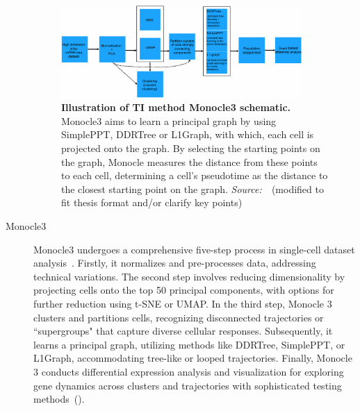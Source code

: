 \begin{description}
\begin{figure}[h!]
  	\centering
  	\includegraphics[width=0.90\textwidth]{TI_Alg_Monocle3/fig}
  	\vspace{0.1cm}
  	\caption[Illustration of TI method Monocle3 schematic.]{\textbf{Illustration of TI method Monocle3 schematic.} Monocle3 aims to learn a principal graph by using SimplePPT, DDRTree or L1Graph, with which, each cell is projected onto the graph. By selecting the starting points on the graph, Monocle measures the distance from these points to each cell, determining a cell's pseudotime as the distance to the closest starting point on the graph. \emph{Source:~\cite{cao2019monocle3}}~(modified to fit thesis format and/or clarify key points)
  	}
  	\label{fig:TI_Alg_Monocle3}
\end{figure}

  \item[Monocle3]
  Monocle3 undergoes a comprehensive five-step process in single-cell dataset analysis~\citep{cao2019monocle3}. Firstly, it normalizes and pre-processes data, addressing technical variations. The second step involves reducing dimensionality by projecting cells onto the top 50 principal components, with options for further reduction using t-SNE or UMAP. In the third step, Monocle 3 clusters and partitions cells, recognizing disconnected trajectories or ``supergroups" that capture diverse cellular responses. Subsequently, it learns a principal graph, utilizing methods like DDRTree, SimplePPT, or L1Graph, accommodating tree-like or looped trajectories. Finally, Monocle 3 conducts differential expression analysis and visualization for exploring gene dynamics across clusters and trajectories with sophisticated testing methods~().


\end{description}
